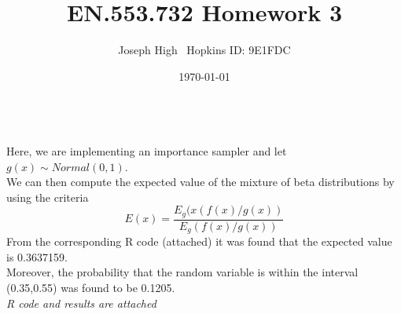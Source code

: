 \documentclass[10pt,a4paper]{article}
\begin{document}
\title{EN.553.732 Homework 3}
\author{Joseph High \ Hopkins ID: 9E1FDC}
\date{\today}
\maketitle 
 
\newcommand{\N}{\mathbb{N}}
\newcommand{\R}{\mathbb{R}}
\newcommand{\Z}{\mathbb{Z}}
\newcommand{\Q}{\mathbb{Q}}
 

\newenvironment{problem}[2][Problem]{\begin{trivlist}
\item[\hskip \labelsep {\bfseries #1}\hskip \labelsep {\bfseries #2.}]}{\end{trivlist}}

 
 

 
 
\begin{problem}{1}
\text{ }\\
Here, we are implementing an importance sampler and let  $g(x)\sim Normal(0,1)$. \\
We can then compute the expected value of the mixture of beta distributions by using the criteria
$$E(x)=\frac{E_g(x(f(x)/g(x))}{E_g(f(x)/g(x))} $$
From the corresponding R code (attached) it was found that the expected value is 0.3637159.
\\
Moreover, the probability that the random variable is within the interval (0.35,0.55) was found to be 0.1205. 
\\
\textit{R code and results are attached}

\end{problem}
\end{document}
